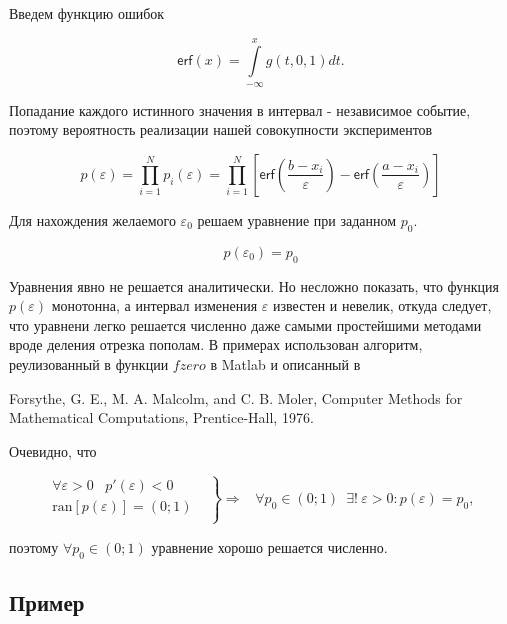 \documentclass[a4paper,12pt]{article} %
\begin{document}
Введем функцию ошибок

\begin{equation}
\textsf{erf}(x) = \int\limits_{- \infty}^x g(t, 0, 1) dt.
\end{equation}

Попадание каждого истинного значения в интервал - независимое событие, поэтому вероятность реализации нашей совокупности экспериментов

\begin{equation}
p(\varepsilon) = \prod_{i = 1}^N p_i(\varepsilon) = \prod_{i = 1}^N \left[ \textsf{erf} \left( \dfrac{b - x_i}{\varepsilon} \right) - \textsf{erf} \left( \dfrac{a - x_i}{\varepsilon} \right) \right]
\end{equation}

Для нахождения желаемого $\varepsilon_0$ решаем уравнение при заданном $p_0$.

\begin{equation}
p(\varepsilon_0) = p_0
\end{equation}

Уравнения явно не решается аналитически. Но несложно показать, что функция $p(\varepsilon)$ монотонна, а интервал изменения $\varepsilon$ известен и невелик, откуда следует, что уравнени легко решается численно даже самыми простейшими методами вроде деления отрезка пополам. В примерах использован алгоритм, реулизованный в функции $fzero$ в Matlab и описанный в \cite{grund1979forsythe}

Forsythe, G. E., M. A. Malcolm, and C. B. Moler, Computer Methods for Mathematical Computations, Prentice-Hall, 1976.

Очевидно, что

\begin{equation} 
\left.
\begin{aligned} 
\forall \varepsilon > 0 \hspace{10pt} p'(\varepsilon) < 0 & \\
\text{ran} [p(\varepsilon)] = (0;1) & \\
\end{aligned}
\right\} \Rightarrow \hspace{10pt} \forall p_0 \in (0;1) \hspace{6pt} \exists ! \hspace{3pt} \varepsilon > 0 : p(\varepsilon) = p_0,
\end{equation}

поэтому $\forall p_0 \in (0;1)$ уравнение хорошо решается численно.

\subsection{Пример}
\end{document}
